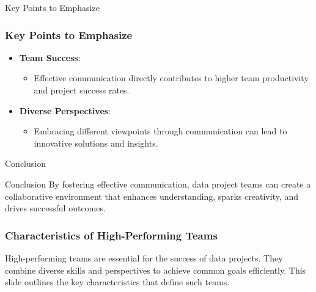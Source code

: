 \documentclass[aspectratio=169]{beamer}
\begin{document}
\begin{frame}[fragile]{Key Points to Emphasize}
    \frametitle{Key Points to Emphasize}
    \begin{itemize}
        \item \textbf{Team Success}:
            \begin{itemize}
                \item Effective communication directly contributes to higher team productivity and project success rates.
            \end{itemize}
        \item \textbf{Diverse Perspectives}:
            \begin{itemize}
                \item Embracing different viewpoints through communication can lead to innovative solutions and insights.
            \end{itemize}
    \end{itemize}
\end{frame}

\begin{frame}[fragile]{Conclusion}
    \begin{block}{Conclusion}
        By fostering effective communication, data project teams can create a collaborative environment that enhances understanding, sparks creativity, and drives successful outcomes.
    \end{block}
\end{frame}

\begin{frame}[fragile]
    \frametitle{Characteristics of High-Performing Teams}
    High-performing teams are essential for the success of data projects. They combine diverse skills and perspectives to achieve common goals efficiently. This slide outlines the key characteristics that define such teams.
\end{frame}
\end{document}
